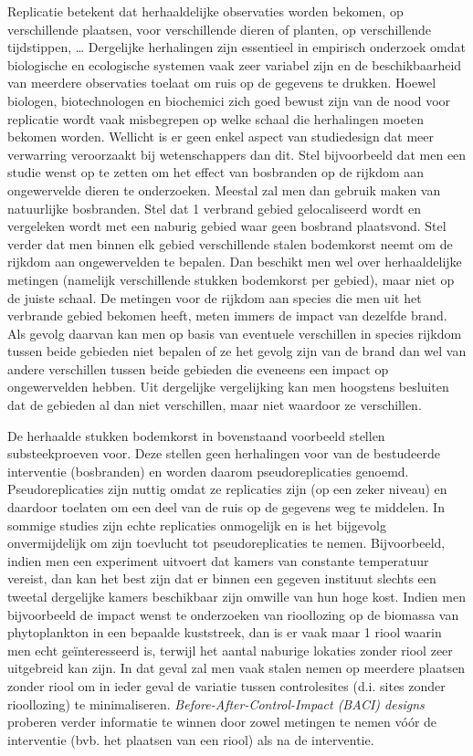 \documentclass[
  dutch,
  letterpaper,
  12pt]{book}
\theoremstyle{definition}
\theoremstyle{definition}
\theoremstyle{definition}
\theoremstyle{remark}
\begin{document}
Replicatie betekent dat herhaaldelijke observaties worden bekomen, op
verschillende plaatsen, voor verschillende dieren of planten, op
verschillende tijdstippen, \ldots{} Dergelijke herhalingen zijn
essentieel in empirisch onderzoek omdat biologische en ecologische
systemen vaak zeer variabel zijn en de beschikbaarheid van meerdere
observaties toelaat om ruis op de gegevens te drukken. Hoewel biologen,
biotechnologen en biochemici zich goed bewust zijn van de nood voor
replicatie wordt vaak misbegrepen op welke schaal die herhalingen moeten
bekomen worden. Wellicht is er geen enkel aspect van studiedesign dat
meer verwarring veroorzaakt bij wetenschappers dan dit. Stel
bijvoorbeeld dat men een studie wenst op te zetten om het effect van
bosbranden op de rijkdom aan ongewervelde dieren te onderzoeken. Meestal
zal men dan gebruik maken van natuurlijke bosbranden. Stel dat 1
verbrand gebied gelocaliseerd wordt en vergeleken wordt met een naburig
gebied waar geen bosbrand plaatsvond. Stel verder dat men binnen elk
gebied verschillende stalen bodemkorst neemt om de rijkdom aan
ongewervelden te bepalen. Dan beschikt men wel over herhaaldelijke
metingen (namelijk verschillende stukken bodemkorst per gebied), maar
niet op de juiste schaal. De metingen voor de rijkdom aan species die
men uit het verbrande gebied bekomen heeft, meten immers de impact van
dezelfde brand. Als gevolg daarvan kan men op basis van eventuele
verschillen in species rijkdom tussen beide gebieden niet bepalen of ze
het gevolg zijn van de brand dan wel van andere verschillen tussen beide
gebieden die eveneens een impact op ongewervelden hebben. Uit dergelijke
vergelijking kan men hoogstens besluiten dat de gebieden al dan niet
verschillen, maar niet waardoor ze verschillen.

De herhaalde stukken bodemkorst in bovenstaand voorbeeld stellen
substeekproeven voor. Deze stellen geen herhalingen voor van de
bestudeerde interventie (bosbranden) en worden daarom pseudoreplicaties
genoemd. Pseudoreplicaties zijn nuttig omdat ze replicaties zijn (op een
zeker niveau) en daardoor toelaten om een deel van de ruis op de
gegevens weg te middelen. In sommige studies zijn echte replicaties
onmogelijk en is het bijgevolg onvermijdelijk om zijn toevlucht tot
pseudoreplicaties te nemen. Bijvoorbeeld, indien men een experiment
uitvoert dat kamers van constante temperatuur vereist, dan kan het best
zijn dat er binnen een gegeven instituut slechts een tweetal dergelijke
kamers beschikbaar zijn omwille van hun hoge kost. Indien men
bijvoorbeeld de impact wenst te onderzoeken van rioollozing op de
biomassa van phytoplankton in een bepaalde kuststreek, dan is er vaak
maar 1 riool waarin men echt geïnteresseerd is, terwijl het aantal
naburige lokaties zonder riool zeer uitgebreid kan zijn. In dat geval
zal men vaak stalen nemen op meerdere plaatsen zonder riool om in ieder
geval de variatie tussen controlesites (d.i. sites zonder rioollozing)
te minimaliseren. \emph{Before-After-Control-Impact (BACI) designs}
proberen verder informatie te winnen door zowel metingen te nemen vóór
de interventie (bvb. het plaatsen van een riool) als na de interventie.
\end{document}
